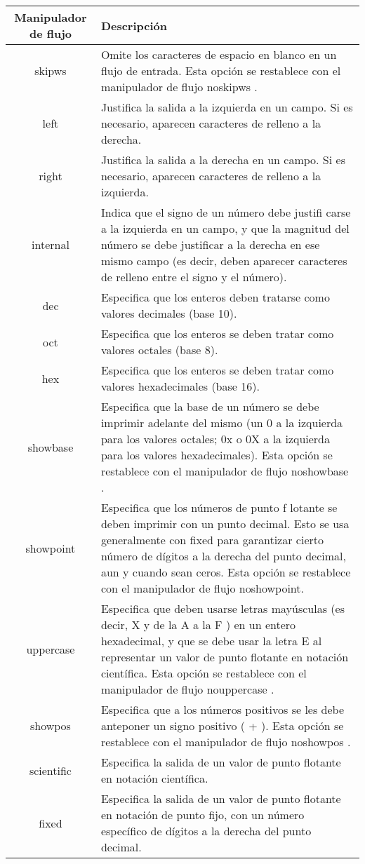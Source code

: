 \begin{longtable}{|c|p{11cm}|}
	\hline
  \textbf{Manipulador de flujo}	& \textbf{Descripción}  \\
	\hline
	skipws & Omite los caracteres de espacio en blanco en un flujo de entrada. Esta opción se restablece con el
manipulador de flujo noskipws . \\
	\hline
	left & Justifica la salida a la izquierda en un campo. Si es necesario, aparecen caracteres de relleno a la
derecha.  \\
	\hline
	right & Justifica la salida a la derecha en un campo. Si es necesario, aparecen caracteres de relleno a la izquierda.  \\
	\hline
	internal & Indica que el signo de un número debe justifi carse a la izquierda en un campo, y que la magnitud
del número se debe justificar a la derecha en ese mismo campo (es decir, deben aparecer caracteres de
relleno entre el signo y el número). \\
	\hline
	dec & Especifica que los enteros deben tratarse como valores decimales (base 10). \\
	\hline
	oct & Especifica que los enteros se deben tratar como valores octales (base 8). \\
	\hline
	hex & Especifica que los enteros se deben tratar como valores hexadecimales (base 16). \\
	\hline
	showbase & Especifica que la base de un número se debe imprimir adelante del mismo (un 0 a la izquierda para
los valores octales; 0x o 0X a la izquierda para los valores hexadecimales). Esta opción se restablece
con el manipulador de flujo noshowbase . \\
	\hline
	showpoint & Especifica que los números de punto f lotante se deben imprimir con un punto decimal. Esto se usa
generalmente con fixed para garantizar cierto número de dígitos a la derecha del punto decimal, aun
y cuando sean ceros. Esta opción se restablece con el manipulador de flujo noshowpoint. \\
	\hline
	uppercase & Especifica que deben usarse letras mayúsculas (es decir, X y de la A a la F ) en un entero hexadecimal,
y que se debe usar la letra E al representar un valor de punto flotante en notación científica. Esta
opción se restablece con el manipulador de flujo nouppercase . \\
	\hline
	showpos & Especifica que a los números positivos se les debe anteponer un signo positivo ( + ). Esta opción se
restablece con el manipulador de flujo noshowpos . \\
	\hline
	scientific & Especifica la salida de un valor de punto flotante en notación científica. \\
	\hline
	fixed & Especifica la salida de un valor de punto flotante en notación de punto fijo, con un número específico de dígitos a la derecha del punto decimal. \\
	\hline
\end{longtable}


